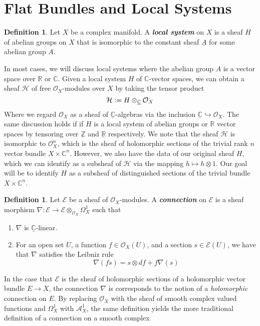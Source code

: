 \documentclass[psamsfonts, 12pt]{amsart}
\theoremstyle{definition}
\newtheorem{defn}[thm]{Definition}
\theoremstyle{remark}
\renewcommand{\O}{\mathcal{O}}
\newcommand{\R}{\mathbb{R}}
\newcommand{\ib}[1]{\textbf{\textit{#1}}}
\newcommand{\Z}{\mathbb{Z}}
\newcommand{\C}{\mathbb{C}}
\newcommand{\defeq}{\vcentcolon=}
\begin{document}
\section{Flat Bundles and Local Systems}
%
\begin{defn}
Let $X$ be a complex manifold. A \ib{local system} on $X$ is a sheaf $H$ of
abelian groups on $X$ that is isomorphic to the constant sheaf $\underline{A}$
for some abelian group $A$.
\end{defn}
%
In most cases, we will discuss local systems where the abelian group $A$ is
a vector space over $\R$ or $\C$. Given a local system $H$ of $\C$-vector
spaces, we can obtain a sheaf $\mathcal{H}$ of free $\O_X$-modules over $X$ by
taking the tensor product
\[
\mathcal{H} \defeq H \otimes_{\underline{\C}} \O_X
\]
Where we regard $\O_X$ as a sheaf of $\underline{\C}$-algebras via the inclusion
$\underline{\C} \hookrightarrow \O_X$. The same discussion holds if if $H$
is a local system of abelian groups or $\R$ vector spaces by tensoring over
$\underline{\Z}$ and $\underline{\R}$ respectively. We note that the sheaf
$\mathcal{H}$ is isomorphic to $\O_X^n$, which is the sheaf of holomorphic sections of
the trivial rank $n$ vector bundle $X \times \C^n$. However, we also have the
data of our original sheaf $H$, which we can identify as a subsheaf of
$\mathcal{H}$ via the mapping $h \mapsto h \otimes 1$. Our goal will be to identify
$H$ as a subsheaf of distinguished sections of the trivial bundle $X \times \C^n$.
%
\begin{defn}
Let $\mathcal{E}$ be a sheaf of $\O_X$-modules. A \ib{connection} on $\mathcal{E}$
is a sheaf morphism $\nabla : \mathcal{E} \to \mathcal{E} \otimes_{\O_X} \Omega^1_X$
such that
\begin{enumerate}
  \item $\nabla$ is $\underline{\C}$-linear.
  \item For an open set $U$, a function $f \in \O_X(U)$, and a section
  $s \in \mathcal{E}(U)$, we have that $\nabla$ satisfies the Leibniz rule
  \[
  \nabla(fs) = s \otimes df + f\nabla(s)
  \]
\end{enumerate}
\end{defn}
%
In the case that $\mathcal{E}$ is the sheaf of holomorphic sections
of a holomorphic vector bundle $E \to X$, the connection $\nabla$ is corresponds to
the notion of a \emph{holomorphic} connection on $E$. By replacing $\O_X$ with the sheaf
of smooth complex valued functions and $\Omega^1_X$ with $\mathcal{A}^1_X$, the same
definition yields the more traditional definition of a connection on a smooth complex
\end{document}
